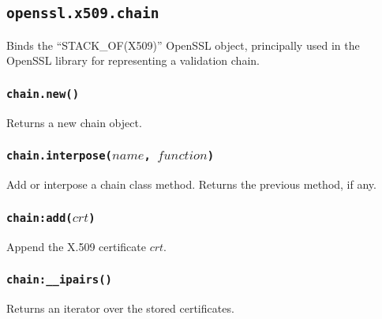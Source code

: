\documentclass[11pt, oneside]{memoir}
\newcommand*{\fn}[1]{\texttt{#1}\xspace}
\newcounter{toccols}
\newenvironment{Module}[1]{
	\subsection{\texttt{#1}}
	\addtocontents{toc}{
		\protect\begin{multicols}{\value{toccols}}
	}
}{
	\addtocontents{toc}{\protect\end{multicols}}
}
\begin{document}
\begin{Module}{openssl.x509.chain}

Binds the ``STACK\_OF(X509)'' OpenSSL object, principally used in the OpenSSL library for representing a validation chain.

\subsubsection[\fn{chain.new}]{\fn{chain.new()}}

Returns a new chain object.

\subsubsection[\fn{chain.interpose}]{\fn{chain.interpose($name$, $function$)}}

Add or interpose a chain class method. Returns the previous method, if any.

\subsubsection[\fn{chain:add}]{\fn{chain:add($crt$)}}

Append the X.509 certificate $crt$.

\subsubsection[\fn{chain:\_\_ipairs}]{\fn{chain:\_\_ipairs()}}

Returns an iterator over the stored certificates.

\end{Module}
\end{document}
